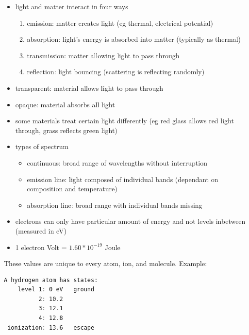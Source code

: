 \documentclass[12pt]{article}
\begin{document}
\begin{itemize}
\begin{itemize}
\end{itemize}
\item light and matter interact in four ways
\begin{enumerate}
\item emission: matter creates light (eg thermal, electrical potential)
\item absorption: light's energy is absorbed into matter (typically as thermal)
\item transmission: matter allowing light to pass through
\item reflection: light bouncing (scattering is reflecting randomly)
\end{enumerate}
\item transparent: material allows light to pass through
\item opaque: material absorbs all light
\item some materials treat certain light differently (eg red glass allows red light through, grass reflects green light)
\item types of spectrum
\begin{itemize}
\item continuous: broad range of wavelengths without interruption
\item emission line: light composed of individual bands (dependant on composition and temperature)
\item absorption line: broad range with individual bands missing
\end{itemize}
\item electrons can only have particular amount of energy and not levels inbetween (measured in eV)
\item 1 electron Volt = $1.60*10^{-19}$ Joule
\end{itemize}

These values are unique to every atom, ion, and molecule. Example:
\begin{verbatim}
A hydrogen atom has states:
    level 1: 0 eV   ground
          2: 10.2
          3: 12.1
          4: 12.8
 ionization: 13.6   escape
\end{verbatim}
\end{document}
